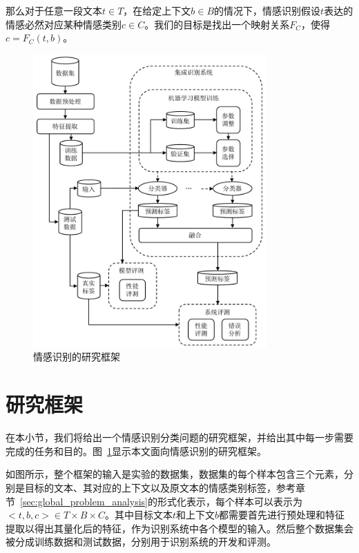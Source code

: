 那么对于任意一段文本$t \in T$，在给定上下文$b \in B$的情况下，情感识别假设$t$表达的情感必然对应某种情感类别$c \in C$。我们的目标是找出一个映射关系$F_C$，使得 $c=F_C(t, b)$。

\begin{figure}[H]
  \centering
  \includegraphics[width=0.8\textwidth]{img/framework_v2.pdf}
  \caption{情感识别的研究框架}
  \label{fig:framework}
\end{figure}

\section{研究框架}
\label{sec:global_framework}

在本小节，我们将给出一个情感识别分类问题的研究框架，并给出其中每一步需要完成的任务和目的。图~\ref{fig:framework}显示本文面向情感识别的研究框架。

如图所示，整个框架的输入是实验的数据集，数据集的每个样本包含三个元素，分别是目标的文本、其对应的上下文以及原文本的情感类别标签，参考章节~\ref{sec:global_problem_analysis}的形式化表示，每个样本可以表示为 $<t, b, c> \in T \times B \times C$。其中目标文本$t$和上下文$b$都需要首先进行预处理和特征提取以得出其量化后的特征，作为识别系统中各个模型的输入。然后整个数据集会被分成训练数据和测试数据，分别用于识别系统的开发和评测。

